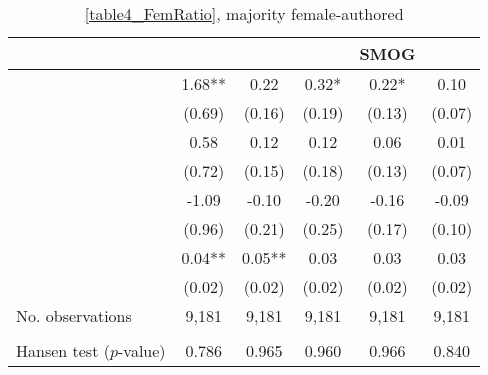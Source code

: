 \begin{table}
    \footnotesize
    \centering
    \begin{threeparttable}
        \caption{\autoref{table4_FemRatio}, majority female-authored}
        \label{table4_Fem50}
        \begin{tabular}{p{4cm}S@{}S@{}S@{}S@{}S@{}}
            \toprule
            &{}&{}&{}&{SMOG}&{}\\
            \midrule
            &        1.68** &        0.22   &        0.32*  &        0.22*  &        0.10   \\
                                          &      (0.69)   &      (0.16)   &      (0.19)   &      (0.13)   &      (0.07)   \\
            &        0.58   &        0.12   &        0.12   &        0.06   &        0.01   \\
                                          &      (0.72)   &      (0.15)   &      (0.18)   &      (0.13)   &      (0.07)   \\
            &       -1.09   &       -0.10   &       -0.20   &       -0.16   &       -0.09   \\
                                          &      (0.96)   &      (0.21)   &      (0.25)   &      (0.17)   &      (0.10)   \\
            &        0.04** &        0.05** &        0.03   &        0.03   &        0.03   \\
                                          &      (0.02)   &      (0.02)   &      (0.02)   &      (0.02)   &      (0.02)   \\
            \midrule
            No. observations     &       9,181   &       9,181   &       9,181   &       9,181   &       9,181   \\
             \\
            \quad Hansen test (\(p\)-value)&       0.786   &       0.965   &       0.960   &       0.966   &       0.840   \\

\end{tabular}
\end{threeparttable}
\end{table}
